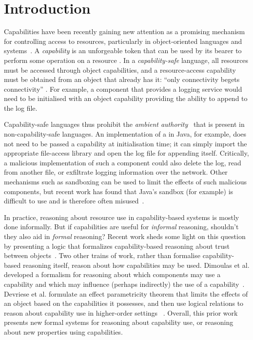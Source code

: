 \section{Introduction}

Capabilities have been recently gaining new attention as a promising
mechanism for controlling access to resources, particularly in
object-oriented languages and
systems~\cite{miller03,drossopoulou07,dimoulas14,devriese16}.  A
\textit{capability} is an unforgeable token that can be used by its
bearer to perform some operation on a resource \cite{dennis66}.  In a
\textit{capability-safe} language, all resources must be accessed
through object capabilities, and a resource-access capability must be
obtained from an object that already has it: ``only connectivity
begets connectivity'' \cite{miller03}.  For example, a 
component that provides a logging service would need to be initialised
with an object capability providing the ability to append to the log
file.

Capability-safe languages thus prohibit the \textit{ambient
  authority}~\cite{miller06} that is present in non-capability-safe
languages.  An implementation of a  in Java, for example,
does not need to be passed a capability at initialisation time; it can
simply import the appropriate file-access library and open the log
file for appending itself.  Critically, a malicious implementation of
such a component could also delete the log, read from another file, or
exfiltrate logging information over the network.  Other mechanisms
such as sandboxing can be used to limit the effects of such malicious
components, but recent work has found that Java's sandbox (for
example) is difficult to use and is therefore often
misused~\cite{coker15,maass16}.

In practice, reasoning about resource use in capability-based systems
is mostly done informally.
But if capabilities are useful for \textit{informal} reasoning,
shouldn't they also aid in \textit{formal} reasoning?  Recent work
sheds some light on this question by presenting a logic that
formalizes capability-based reasoning about trust between
objects~\cite{drossopoulou07}.  Two other trains of work, rather than
formalise capability-based reasoning itself, reason about how
capabilities may be used.  Dimoulas et al. developed a formalism for
reasoning about which components may use a capability and which may
influence (perhaps indirectly) the use of a
capability~\cite{dimoulas14}.  Devriese et al. formulate an effect
parametricity theorem that limits the effects of an object based on
the capabilities it possesses, and then use logical relations to
reason about capability use in higher-order settings~\cite{devriese16}
.  Overall, this prior work presents new formal systems for reasoning
about capability use, or reasoning about new properties using
capabilities.

